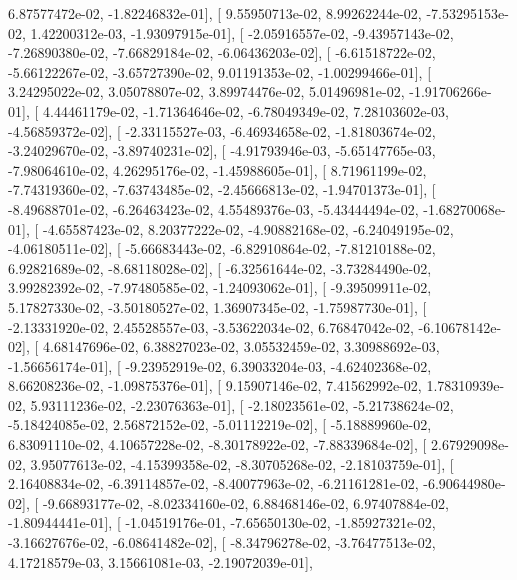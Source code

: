 \documentclass{article}
\begin{document}
          6.87577472e-02,  -1.82246832e-01],
       [  9.55950713e-02,   8.99262244e-02,  -7.53295153e-02,
          1.42200312e-03,  -1.93097915e-01],
       [ -2.05916557e-02,  -9.43957143e-02,  -7.26890380e-02,
         -7.66829184e-02,  -6.06436203e-02],
       [ -6.61518722e-02,  -5.66122267e-02,  -3.65727390e-02,
          9.01191353e-02,  -1.00299466e-01],
       [  3.24295022e-02,   3.05078807e-02,   3.89974476e-02,
          5.01496981e-02,  -1.91706266e-01],
       [  4.44461179e-02,  -1.71364646e-02,  -6.78049349e-02,
          7.28103602e-03,  -4.56859372e-02],
       [ -2.33115527e-03,  -6.46934658e-02,  -1.81803674e-02,
         -3.24029670e-02,  -3.89740231e-02],
       [ -4.91793946e-03,  -5.65147765e-03,  -7.98064610e-02,
          4.26295176e-02,  -1.45988605e-01],
       [  8.71961199e-02,  -7.74319360e-02,  -7.63743485e-02,
         -2.45666813e-02,  -1.94701373e-01],
       [ -8.49688701e-02,  -6.26463423e-02,   4.55489376e-03,
         -5.43444494e-02,  -1.68270068e-01],
       [ -4.65587423e-02,   8.20377222e-02,  -4.90882168e-02,
         -6.24049195e-02,  -4.06180511e-02],
       [ -5.66683443e-02,  -6.82910864e-02,  -7.81210188e-02,
          6.92821689e-02,  -8.68118028e-02],
       [ -6.32561644e-02,  -3.73284490e-02,   3.99282392e-02,
         -7.97480585e-02,  -1.24093062e-01],
       [ -9.39509911e-02,   5.17827330e-02,  -3.50180527e-02,
          1.36907345e-02,  -1.75987730e-01],
       [ -2.13331920e-02,   2.45528557e-03,  -3.53622034e-02,
          6.76847042e-02,  -6.10678142e-02],
       [  4.68147696e-02,   6.38827023e-02,   3.05532459e-02,
          3.30988692e-03,  -1.56656174e-01],
       [ -9.23952919e-02,   6.39033204e-03,  -4.62402368e-02,
          8.66208236e-02,  -1.09875376e-01],
       [  9.15907146e-02,   7.41562992e-02,   1.78310939e-02,
          5.93111236e-02,  -2.23076363e-01],
       [ -2.18023561e-02,  -5.21738624e-02,  -5.18424085e-02,
          2.56872152e-02,  -5.01112219e-02],
       [ -5.18889960e-02,   6.83091110e-02,   4.10657228e-02,
         -8.30178922e-02,  -7.88339684e-02],
       [  2.67929098e-02,   3.95077613e-02,  -4.15399358e-02,
         -8.30705268e-02,  -2.18103759e-01],
       [  2.16408834e-02,  -6.39114857e-02,  -8.40077963e-02,
         -6.21161281e-02,  -6.90644980e-02],
       [ -9.66893177e-02,  -8.02334160e-02,   6.88468146e-02,
          6.97407884e-02,  -1.80944441e-01],
       [ -1.04519176e-01,  -7.65650130e-02,  -1.85927321e-02,
         -3.16627676e-02,  -6.08641482e-02],
       [ -8.34796278e-02,  -3.76477513e-02,   4.17218579e-03,
          3.15661081e-03,  -2.19072039e-01],
\end{document}
